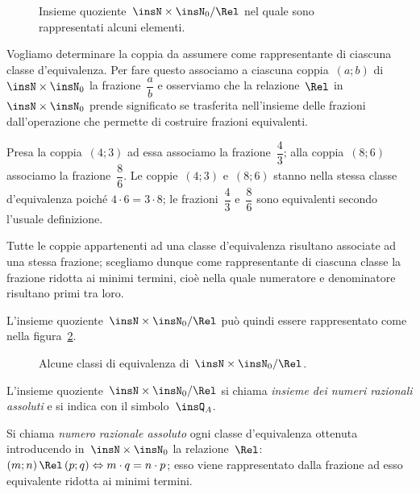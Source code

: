 \begin{figure}[t]
 \centering
 \caption{Insieme quoziente~$\insN\times \insN_{0}/\Rel$ nel quale sono rappresentati alcuni elementi.}\label{fig:E.5}
\end{figure}

Vogliamo determinare la coppia da assumere come rappresentante di ciascuna classe d'equivalenza. Per fare questo associamo
a ciascuna coppia~$(a;b)$ di~$\insN\times\insN_{0}$ la frazione~$\dfrac{a}{b}$ e osserviamo che la relazione~$\Rel$ in~$\insN\times\insN_{0}$ prende significato
se trasferita nell'insieme delle frazioni dall'operazione che permette di costruire frazioni equivalenti.
\begin{exrig}
 \begin{esempio}
Presa la coppia~$(4;3)$ ad essa associamo la frazione~$\dfrac{4}{3}$; alla coppia~$(8;6)$ associamo la frazione~$\dfrac{8}{6}$.
Le coppie~$(4;3)$ e~$(8;6)$ stanno nella stessa classe d'equivalenza poiché $4\cdot 6=3\cdot 8$; le frazioni~$\dfrac{4}{3}$ e~$\dfrac{8}{6}$
sono equivalenti secondo l'usuale definizione.
 \end{esempio}
\end{exrig}

\conclusione Tutte le coppie appartenenti ad una classe d'equivalenza risultano associate ad una stessa frazione; scegliamo dunque come rappresentante
di ciascuna classe la frazione ridotta ai minimi termini, cioè nella quale numeratore e denominatore risultano primi tra loro.

L'insieme quoziente~$\insN\times\insN_{0}/\Rel$ può quindi essere rappresentato come nella figura~\ref{fig:E.6}.
\begin{figure}[t]
 \centering
 \caption{Alcune classi di equivalenza di~$\insN\times\insN_{0}/\Rel$.}\label{fig:E.6}
\end{figure}

\begin{definizione}
L'insieme quoziente~$\insN\times\insN_{0}/\Rel$ si chiama \emph{insieme dei numeri razionali assoluti} e si indica con il simbolo~$\insQ_{A}$.
\end{definizione}

\begin{definizione}
Si chiama \emph{numero razionale assoluto} ogni classe d'equivalenza ottenuta introducendo in~$\insN\times\insN_{0}$ la relazione~$\Rel$:
$(m;n)\,\Rel\, (p;q) \Leftrightarrow m\cdot q=n\cdot p$; esso viene rappresentato dalla frazione ad esso equivalente ridotta ai minimi termini.
\end{definizione}

